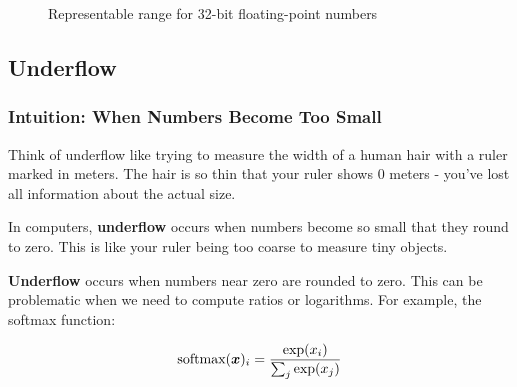 \begin{figure}[h]
\centering
{}
\caption{Representable range for 32-bit floating-point numbers}
\label{fig:float-range}
\end{figure}

\subsection{Underflow}

\subsubsection{Intuition: When Numbers Become Too Small}

Think of underflow like trying to measure the width of a human hair with a ruler marked in meters. The hair is so thin that your ruler shows 0 meters - you've lost all information about the actual size.

In computers, \textbf{underflow} occurs when numbers become so small that they round to zero. This is like your ruler being too coarse to measure tiny objects.

\textbf{Underflow} occurs when numbers near zero are rounded to zero. This can be problematic when we need to compute ratios or logarithms. For example, the softmax function:

\begin{equation}
\text{softmax}(\boldsymbol{x})_i = \frac{\exp(x_i)}{\sum_j \exp(x_j)}
\end{equation}

